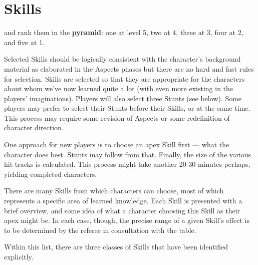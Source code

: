 \section{Skills}\label{sec:skills} %



 and rank them in the \textbf{pyramid}: one at level 5, two at 4, three at 3, four at 2, and five at 1.

Selected Skills should be logically consistent with the character's background material as elaborated in the Aspects phases but there are no hard and fast rules for selection. Skills are selected so that they are appropriate for the characters about whom we've now learned quite a lot (with even more existing in the players' imaginations). Players will also select three Stunts (see below). Some players may prefer to select their Stunts before their Skills, or at the same time. This process may require some revision of Aspects or some redefinition of character direction.

One approach for new players is to choose an apex Skill first --- what the character does best. Stunts may follow from that. Finally, the size of the various hit tracks is calculated. This process might take another 20-30 minutes perhaps, yielding completed characters.

There are many Skills from which characters can choose, most of which represents a specific area of learned knowledge. Each Skill is presented with a brief overview, and some idea of what a character choosing this Skill as their apex might be. In each case, though, the precise range of a given Skill's effect is to be determined by the referee in consultation with the table.


Within this list, there are three classes of Skills that have been identified explicitly.

